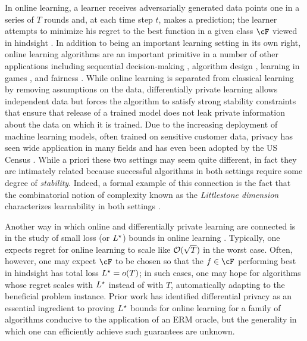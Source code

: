 In online learning, a learner receives adversarially generated data points one in a series of $T$ rounds and, at each time step $t$, makes a prediction; the learner attempts to minimize his regret to the best function in a given class $\cF$ viewed in hindsight \citep{cesa2006prediction}.  
In addition to being an important learning setting in its own right, online learning algorithms are an important primitive in a number of other applications including sequential decision-making \citep{Lattimore_Szepesvári_2020}, algorithm design \citep{MWU}, learning in games \citep{cesa2006prediction}, and fairness \citep{haghtalab2023unifying}. 
While online learning is separated from classical learning by removing assumptions on the data, differentially private learning \citep{DworkMNS06} allows independent data but forces the algorithm to satisfy strong stability constraints that ensure that release of a trained model does not leak private information about the data on which it is trained.  Due to the increasing deployment of machine learning models, often trained on sensitive customer data, privacy has seen wide application in many fields \citep{dwork2014algorithmic} and has even been adopted by the US Census \citep{abowdcensus}.  While a priori these two settings may seem quite different, in fact they are intimately related because successful algorithms in both settings require some degree of \emph{stability}.  Indeed, a formal example of this connection is the fact that the combinatorial notion of complexity known as the \emph{Littlestone dimension} \citep{littlestone1988learning,ben2009agnostic} characterizes learnability in both settings \citep{AlonLMM19,bun2020equivalence}.

Another way in which online and differentially private learning are connected is in the study of small loss (or $L^\star$) bounds in online learning \citep[Section 2.4]{cesa2006prediction}.
Typically, one expects regret for online learning to scale like $\mathcal{O}(\sqrt{T})$ in the worst case.  Often, however, one may expect $\cF$ to be chosen so that the $f \in \cF$ performing best in hindsight has total loss $L^\star = o(T)$; in such cases, one may hope for algorithms  whose regret scales with $L^\star$ instead of with $T$, automatically adapting to the beneficial problem instance.  Prior work \citep{hutter2004prediction,abernethy2019online,wang2022adaptive} has identified differential privacy as an essential ingredient to proving $L^\star$ bounds for online learning for a family of algorithms conducive to the application of an ERM oracle, but the generality in which one can efficiently achieve such guarantees are unknown.  

